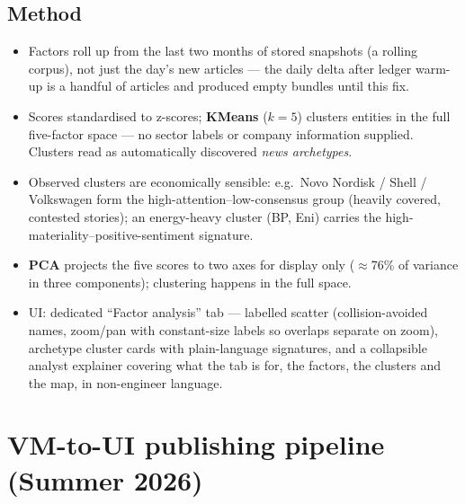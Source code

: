 \documentclass[11pt]{article}
\begin{document}
\subsection{Method}
\begin{itemize}
  \item Factors roll up from the last two months of stored snapshots (a rolling corpus), not just the day's new articles --- the daily delta after ledger warm-up is a handful of articles and produced empty bundles until this fix.
  \item Scores standardised to z-scores; \textbf{KMeans} (\(k=5\)) clusters entities in the full five-factor space --- no sector labels or company information supplied. Clusters read as automatically discovered \emph{news archetypes}.
  \item Observed clusters are economically sensible: e.g.\ Novo Nordisk / Shell / Volkswagen form the high-attention--low-consensus group (heavily covered, contested stories); an energy-heavy cluster (BP, Eni) carries the high-materiality--positive-sentiment signature.
  \item \textbf{PCA} projects the five scores to two axes for display only (\(\approx\)76\% of variance in three components); clustering happens in the full space.
  \item UI: dedicated ``Factor analysis'' tab --- labelled scatter (collision-avoided names, zoom/pan with constant-size labels so overlaps separate on zoom), archetype cluster cards with plain-language signatures, and a collapsible analyst explainer covering what the tab is for, the factors, the clusters and the map, in non-engineer language.
\end{itemize}

\section{VM-to-UI publishing pipeline (Summer 2026)}
\label{sec:vmpipe}
\end{document}
